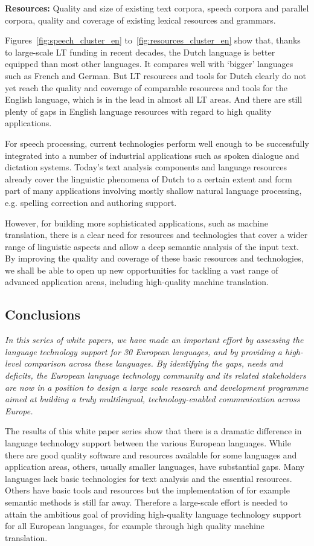 \begin{multicols}{2}
\textbf{Resources:} Quality and size of existing text corpora, speech corpora and parallel corpora, quality and coverage of existing lexical resources and grammars.

Figures~\ref{fig:speech_cluster_en} to~\ref{fig:resources_cluster_en} show that,  thanks to large-scale LT funding in recent decades, the Dutch language is better equipped than most other languages. It compares well with `bigger'  languages such as French and German. But LT resources and tools for Dutch clearly do not yet reach the quality and coverage of comparable resources and tools for the English language, which is in the lead in almost all LT areas. And there are still plenty of gaps in English language resources with regard to high quality applications.

    For speech processing, current technologies perform well enough to be successfully integrated into a number of industrial applications such as spoken dialogue and dictation systems. Today's text analysis components and language resources already cover the linguistic phenomena of Dutch to a certain extent and form part of many applications involving mostly shallow natural language processing, e.g. spelling correction and authoring support.

    However, for building more sophisticated applications, such as machine translation, there is a clear need for resources and technologies that cover a wider range of linguistic aspects and allow a deep semantic analysis of the input text. By improving the quality and coverage of these basic resources and technologies, we shall be able to open up new opportunities for tackling a vast range of advanced application areas, including high-quality machine translation.

\subsection{Conclusions}

\textit{In this series of white papers, we have made an important effort by assessing the language technology support for 30 European languages, and by providing a high-level comparison across these languages. By identifying the gaps, needs and deficits, the European language technology community and its related stakeholders are now in a position to design a large scale research and development programme aimed at building a truly multilingual, technology-enabled communication across Europe.}

The results of this white paper series show that there is a dramatic difference in language technology support between the various European languages. While there are good quality software and resources available for some languages and application areas, others, usually smaller languages, have substantial gaps. Many languages lack basic technologies for text analysis and the essential resources. Others have basic tools and resources but the implementation of for example semantic methods is still far away. Therefore a large-scale effort is needed to attain the ambitious goal of providing high-quality language technology support for all European languages, for example through high quality machine translation.


\end{multicols}
